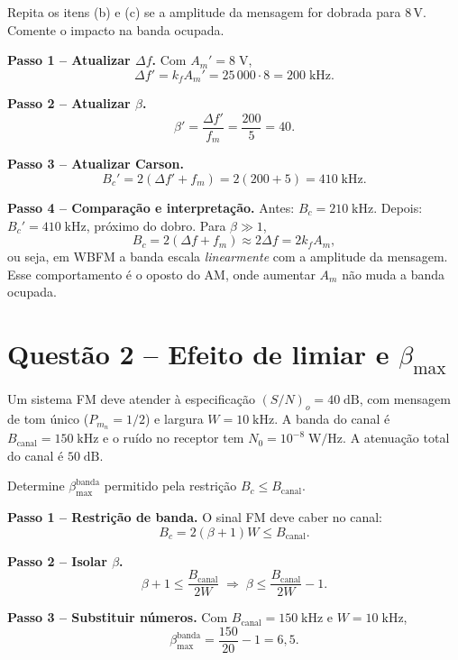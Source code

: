 \documentclass[11pt,a4paper]{article}
\begin{document}
\begin{enunciado}[Item e)]
Repita os itens (b) e (c) se a amplitude da mensagem for dobrada para $8$\,V. Comente o impacto na banda ocupada.
\end{enunciado}

\begin{resolucao}

\textbf{Passo 1 -- Atualizar $\Delta f$.} Com $A_m' = 8\;\text{V}$,
\[
  \Delta f' = k_f A_m' = 25\,000 \cdot 8 = 200\;\text{kHz}.
\]

\textbf{Passo 2 -- Atualizar $\beta$.}
\[
  \beta' = \frac{\Delta f'}{f_m} = \frac{200}{5} = 40.
\]

\textbf{Passo 3 -- Atualizar Carson.}
\[
  B_c' = 2(\Delta f' + f_m) = 2(200 + 5) = \boxed{410\;\text{kHz}.}
\]

\textbf{Passo 4 -- Comparação e interpretação.} Antes: $B_c = 210\;\text{kHz}$. Depois: $B_c' = 410\;\text{kHz}$, próximo do dobro. Para $\beta \gg 1$,
\[
  B_c = 2(\Delta f + f_m) \approx 2\Delta f = 2 k_f A_m,
\]
ou seja, em WBFM a banda escala \emph{linearmente} com a amplitude da mensagem. Esse comportamento é o oposto do AM, onde aumentar $A_m$ não muda a banda ocupada.
\end{resolucao}

\section*{Questão 2 -- Efeito de limiar e $\beta_{\max}$}

\begin{enunciado}
Um sistema FM deve atender à especificação $(S/N)_o = 40\;\text{dB}$, com mensagem de tom único ($P_{m_n} = 1/2$) e largura $W = 10\;\text{kHz}$. A banda do canal é $B_{\text{canal}} = 150\;\text{kHz}$ e o ruído no receptor tem $N_0 = 10^{-8}\;\text{W/Hz}$. A atenuação total do canal é $50\;\text{dB}$.
\end{enunciado}

\begin{enunciado}[Item a)]
Determine $\beta_{\max}^{\text{banda}}$ permitido pela restrição $B_c \le B_{\text{canal}}$.
\end{enunciado}

\begin{resolucao}

\textbf{Passo 1 -- Restrição de banda.} O sinal FM deve caber no canal:
\[
  B_c = 2(\beta + 1) W \le B_{\text{canal}}.
\]

\textbf{Passo 2 -- Isolar $\beta$.}
\[
  \beta + 1 \le \frac{B_{\text{canal}}}{2W} \;\Rightarrow\; \beta \le \frac{B_{\text{canal}}}{2W} - 1.
\]

\textbf{Passo 3 -- Substituir números.} Com $B_{\text{canal}} = 150\;\text{kHz}$ e $W = 10\;\text{kHz}$,
\[
  \boxed{\beta_{\max}^{\text{banda}} = \frac{150}{20} - 1 = 6{,}5.}
\]
\end{resolucao}
\end{document}
